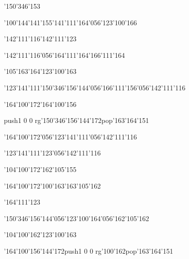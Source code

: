 \null\vfill\ipa\centerline{\enskip\enskip\enskip\enskip\enskip\enskip\enskip\char'150\char'346\char'153}\medskip\centerline{\enskip\char'100\char'144\enskip\char'141\enskip\enskip\enskip\enskip\enskip\enskip\enskip\enskip\char'155\char'141\char'111\char'164\char'056\char'123\char'100\char'166}\medskip\centerline{\enskip\char'142\char'111\char'116\enskip\enskip\enskip\enskip\enskip\enskip\enskip\enskip\enskip\enskip\char'142\char'111\char'123}\medskip\centerline{\enskip\char'142\char'111\char'116\char'056\char'164\char'111\char'164\enskip\enskip\enskip\enskip\enskip\enskip\char'166\char'111\char'164}\medskip\centerline{\enskip\char'105\char'163\char'164\enskip\enskip\enskip\enskip\enskip\enskip\enskip\char'123\char'100\char'163}\medskip\centerline{\enskip\char'123\char'141\char'111\enskip\char'150\char'346\char'156\char'144\char'056\char'166\char'111\char'156\char'056\char'142\char'111\char'116}\medskip\centerline{\enskip\enskip\enskip\enskip\enskip\enskip\enskip\char'164\char'100\char'172\enskip\char'164\char'100\char'156}\medskip\centerline{\enskip\enskip\enskip\enskip\enskip\pdfcolorstack\match push{1 0 0 rg}\char'150\char'346\char'156\char'144\char'172\pdfcolorstack\match pop{}\enskip\enskip\enskip\enskip\enskip\enskip\char'163\char'164\char'151}\medskip\vfill\footline{\hfil\tt\folio\hfil}\eject
\null\vfill\ipa\centerline{\enskip\char'164\char'100\char'172\char'056\char'123\char'141\char'111\char'056\char'142\char'111\char'116}\medskip\centerline{\enskip\enskip\enskip\enskip\enskip\enskip\enskip\enskip\enskip\enskip\enskip\enskip\enskip\char'123\char'141\char'111\char'123\char'056\char'142\char'111\char'116}\medskip\centerline{\enskip\char'104\char'100\char'172\enskip\enskip\enskip\enskip\enskip\enskip\enskip\enskip\enskip\enskip\char'162\char'105\char'155}\medskip\centerline{\enskip\char'164\char'100\char'172\enskip\enskip\enskip\enskip\enskip\char'100\char'163\enskip\enskip\enskip\char'163\char'105\char'162}\medskip\centerline{\enskip\enskip\enskip\enskip\enskip\enskip\enskip\char'164\char'111\char'123\enskip\enskip\enskip\enskip}\medskip\centerline{\enskip\enskip\enskip\enskip\enskip\char'150\char'346\char'156\char'144\char'056\char'123\char'100\char'164\char'056\char'162\char'105\char'162}\medskip\centerline{\enskip\enskip\enskip\enskip\enskip\enskip\enskip\char'104\char'100\char'162\enskip\char'123\char'100\char'163}\medskip\centerline{\enskip\enskip\enskip\enskip\enskip\char'164\char'100\char'156\char'144\char'172\enskip\pdfcolorstack\match push{1 0 0 rg}\char'100\char'162\pdfcolorstack\match pop{}\enskip\enskip\enskip\char'163\char'164\char'151}\medskip\vfill\footline{\hfil\tt\folio\hfil}\eject
